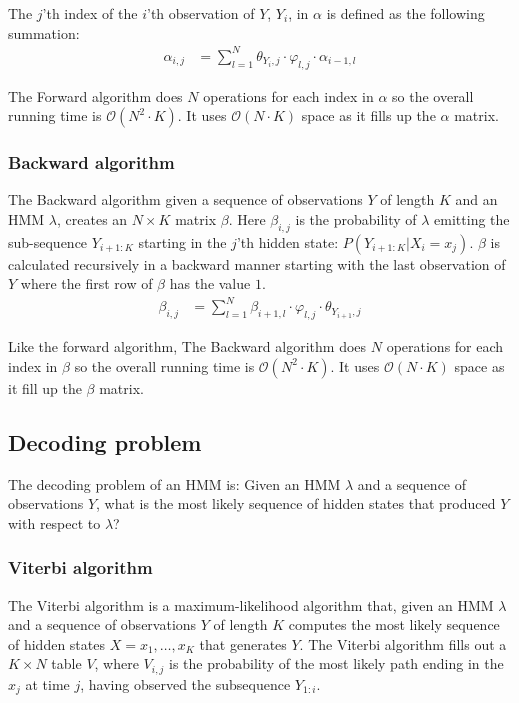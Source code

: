 The $j$'th index of the $i$'th observation of $Y$, $Y_i$, in $\alpha$ is defined as the following summation: 
\begin{align*}
    \alpha_{i,j} &= \sum\limits_{l=1}^{N} \theta_{Y_i,j}\cdot\varphi_{l,j}\cdot\alpha_{i-1,l}
\end{align*}

The Forward algorithm does $ N $ operations for each index in $\alpha$ so the overall running time is $\mathcal{O}( N ^2\cdot K)$. It uses $\mathcal{O}( N \cdot K)$ space as it fills up the $\alpha$ matrix.

\subsubsection{Backward algorithm}

The Backward algorithm\cite{Bishop} given a sequence of observations $Y$ of length $K$ and an HMM $\lambda$, creates an $ N \times K$ matrix $\beta$. Here $\beta_{i,j}$ is the probability of $\lambda$ emitting the sub-sequence $Y_{i+1:K}$ starting in the $j$'th hidden state: $P(Y_{i+1:K}|X_i = x_j)$. 
$\beta$ is calculated recursively in a backward manner starting with the last observation of $Y$ where the first row of $\beta$ has the value $1$.
\begin{align*}
    \beta_{i,j} &= \sum\limits_{l=1}^{N} \beta_{i+1,l}\cdot\varphi_{l,j}\cdot\theta_{Y_{i+1},j}
\end{align*}

Like the forward algorithm, The Backward algorithm does $ N $ operations for each index in $\beta$ so the overall running time is $\mathcal{O}( N ^2\cdot K)$. It uses $\mathcal{O}( N \cdot K)$ space as it fill up the $\beta$ matrix.

\subsection{Decoding problem}

The decoding problem of an HMM is: Given an HMM $\lambda$ and a sequence of observations $Y$, what is the most likely sequence of hidden states that produced $Y$ with respect to $\lambda$? 

\subsubsection{Viterbi algorithm}

The Viterbi algorithm\cite{Bishop} is a maximum-likelihood algorithm that, given an HMM $\lambda$ and a sequence of observations $Y$ of length $K$ computes the most likely sequence of hidden states $X = x_1,\ldots,x_K$ that generates $Y$. 
The Viterbi algorithm fills out a $K \times N$ table $V$, where $V_{i,j}$ is the probability of the most likely path ending in the $x_j$ at time $j$, having observed the subsequence $Y_{1:i}$.


